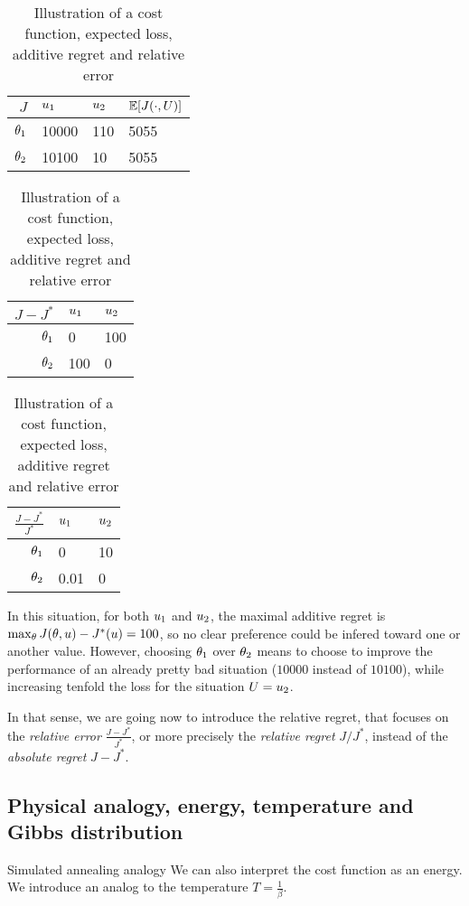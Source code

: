 \documentclass[../../Main_ManuscritThese.tex]{subfiles}
\begin{document}
\begin{table}[ht]
  \centering
  \begin{tabular}{rll|l}
    \toprule
    $J$     & $u_1$ & $u_2$ & $\mathbb{E}[J(\cdot, U)]$  \\ \midrule
    $\theta_1$ & 10000 & 110 & 5055 \\
    $\theta_2$ & 10100 & 10 & 5055 \\ \bottomrule
  \end{tabular}
  \quad
  \begin{tabular}{rll}
    \toprule
    $J-J^*$     & $u_1$ & $u_2$  \\ \midrule
    $\theta_1$ & 0 & 100 \\
    $\theta_2$ & 100 & 0  \\ \bottomrule
  \end{tabular}
    \quad
  \begin{tabular}{rll}
    \toprule
    $\frac{J-J^*}{J^*}$     & $u_1$ & $u_2$  \\ \midrule
    $\theta_1$ & 0 & 10 \\
    $\theta_2$ & 0.01 & 0  \\ \bottomrule
  \end{tabular}  
  \caption{\label{tab:hyp_situation} Illustration of a cost function, expected loss, additive regret and relative error}
\end{table}
In this situation, for both $u_1$ and $u_2$, the maximal additive regret is $\max_{\theta} J(\theta, u) - J^*(u) = 100$, so no clear preference could be infered toward one or another value. %
However, choosing $\theta_1$ over $\theta_2$ means to choose to improve the performance of an already pretty bad situation ($10000$ instead of $10100$), while increasing tenfold the loss for the situation $U=u_2$. 

In that sense, we are going now to introduce the relative regret, that focuses on the \emph{relative error} $\frac{J - J^*}{J^*}$, or more precisely the \emph{relative regret} $J/J^*$, instead of the \emph{absolute regret} $J - J^*$.

\subsection{Physical analogy, energy, temperature and Gibbs distribution}
Simulated annealing analogy
We can also interpret the cost function as an energy. We introduce an analog to the temperature $T = \frac{1}{\beta}$.
\end{document}
